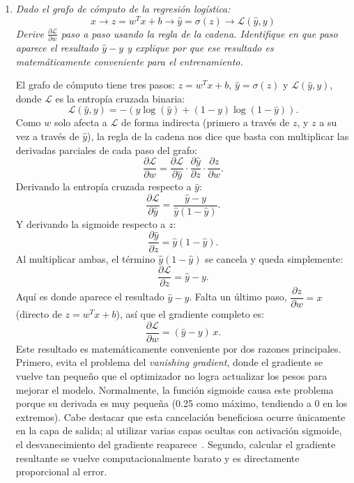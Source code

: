 \documentclass[11pt]{article}
\begin{document}
\begin{enumerate}[label=\alph*.]
  \item \textit{Dado el grafo de cómputo de la regresión logística:
    \[
      x \rightarrow z = w^{T}x + b \rightarrow \hat{y} = \sigma(z) \rightarrow \mathcal{L}(\hat{y},y)
    \]
    Derive $\frac{\partial \mathcal{L}}{\partial w}$ paso a paso usando la regla de la cadena. Identifique en que paso aparece el
    resultado $\hat{y} - y$ y explique por que ese resultado es matemáticamente conveniente para el entrenamiento.}

    El grafo de cómputo tiene tres pasos: $z = w^T x + b$, $\hat{y} = \sigma(z)$ y $\mathcal{L}(\hat{y}, y)$, donde $\mathcal{L}$ es la
    entropía cruzada binaria:
    \[
      \mathcal{L}(\hat{y}, y) = -\left(y \log(\hat{y}) + (1-y)\log(1-\hat{y})\right).
    \]
    Como $w$ solo afecta a $\mathcal{L}$ de forma indirecta (primero a través de $z$, y $z$ a su vez a través de $\hat{y}$), la regla de la
    cadena nos dice que basta con multiplicar las derivadas parciales de cada paso del grafo:
    \[
      \frac{\partial \mathcal{L}}{\partial w} = \frac{\partial \mathcal{L}}{\partial \hat{y}} \cdot \frac{\partial \hat{y}}{\partial z} \cdot \frac{\partial z}{\partial w}.
    \]
    Derivando la entropía cruzada respecto a $\hat{y}$:
    \[
      \frac{\partial \mathcal{L}}{\partial \hat{y}} = \frac{\hat{y} - y}{\hat{y}(1-\hat{y})}.
    \]
    Y derivando la sigmoide respecto a $z$:
    \[
      \frac{\partial \hat{y}}{\partial z} = \hat{y}(1-\hat{y}).
    \]
    Al multiplicar ambas, el término $\hat{y}(1-\hat{y})$ se cancela y queda simplemente:
    \[
      \frac{\partial \mathcal{L}}{\partial z} = \hat{y} - y.
    \]
    Aquí es donde aparece el resultado $\hat{y} - y$. Falta un último paso, $\dfrac{\partial z}{\partial w} = x$ (directo de $z = w^Tx + b$),
    así que el gradiente completo es:
      \[
      \frac{\partial \mathcal{L}}{\partial w} = (\hat{y} - y)\, x.
    \]
    Este resultado es matemáticamente conveniente por dos razones principales. Primero, evita el problema del \textit{vanishing gradient}, donde el
    gradiente se vuelve tan pequeño que el optimizador no logra actualizar los pesos para mejorar el modelo. Normalmente, la función sigmoide causa
    este problema porque su derivada es muy pequeña (0.25 como máximo, tendiendo a 0 en los extremos). Cabe destacar que esta cancelación beneficiosa
    ocurre únicamente en la capa de salida; al utilizar varias capas ocultas con activación sigmoide, el desvanecimiento del gradiente
    reaparece~\cite{merida2026lab04}. Segundo, calcular el gradiente resultante se vuelve computacionalmente barato y es directamente proporcional
    al error.


\end{enumerate}
\end{document}
